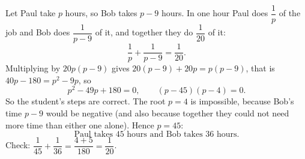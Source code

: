 Let Paul take $p$ hours, so Bob takes $p-9$ hours. In one hour Paul does $\dfrac{1}{p}$ of the job and Bob does $\dfrac{1}{p-9}$ of it, and together they do $\dfrac{1}{20}$ of it:
\[
\dfrac{1}{p}+\dfrac{1}{p-9}=\dfrac{1}{20}.
\]
Multiplying by $20p(p-9)$ gives $20(p-9)+20p=p(p-9)$, that is $40p-180=p^2-9p$, so
\[
p^2-49p+180=0,\qquad (p-45)(p-4)=0 .
\]
So the student's steps are correct. The root $p=4$ is impossible, because Bob's time $p-9$ would be negative (and also because together they could not need more time than either one alone). Hence $p=45$:
\[
\boxed{\text{Paul takes }45\text{ hours and Bob takes }36\text{ hours.}}
\]
Check: $\dfrac{1}{45}+\dfrac{1}{36}=\dfrac{4+5}{180}=\dfrac{1}{20}$.

